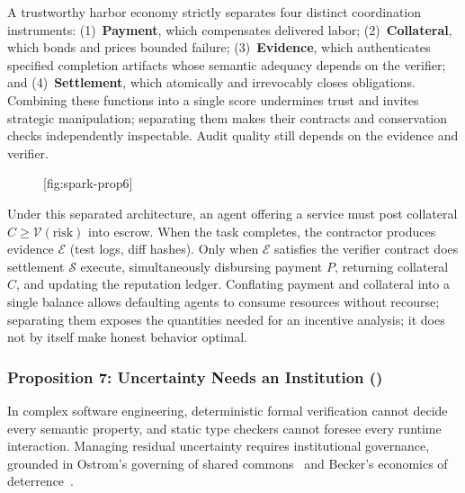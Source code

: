 A trustworthy harbor economy strictly separates four distinct coordination instruments: (1)~\textbf{Payment}, which compensates delivered labor; (2)~\textbf{Collateral}, which bonds and prices bounded failure; (3)~\textbf{Evidence}, which authenticates specified completion artifacts whose semantic adequacy depends on the verifier; and (4)~\textbf{Settlement}, which atomically and irrevocably closes obligations. Combining these functions into a single score undermines trust and invites strategic manipulation; separating them makes their contracts and conservation checks independently inspectable. Audit quality still depends on the evidence and verifier.

\begin{figure}[tp]
  \centering
  [fig:spark-prop6]
\end{figure}

Under this separated architecture, an agent offering a service must post collateral $C \ge \mathcal{V}(\text{risk})$ into escrow. When the task completes, the contractor produces evidence $\mathcal{E}$ (test logs, diff hashes). Only when $\mathcal{E}$ satisfies the verifier contract does settlement $\mathcal{S}$ execute, simultaneously disbursing payment $P$, returning collateral $C$, and updating the reputation ledger. Conflating payment and collateral into a single balance allows defaulting agents to consume resources without recourse; separating them exposes the quantities needed for an incentive analysis; it does not by itself make honest behavior optimal.

\subsubsection*{Proposition 7: Uncertainty Needs an Institution ()}
In complex software engineering, deterministic formal verification cannot decide every semantic property, and static type checkers cannot foresee every runtime interaction. Managing residual uncertainty requires institutional governance, grounded in Ostrom's governing of shared commons~ and Becker's economics of deterrence~.

